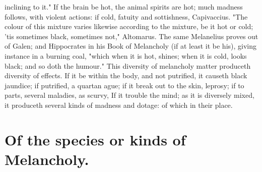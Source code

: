 inclining to it." If the brain be hot, the animal spirits are hot; much madness
follows, with violent actions: if cold, fatuity and sottishness,
Capivaccius. "The colour of this
mixture varies likewise according to the mixture, be it hot or cold; 'tis
sometimes black, sometimes not," Altomarus. The same
Melanelius proves out of Galen; and Hippocrates in his
Book of Melancholy (if at least it be his), giving instance in a burning coal,
"which when it is hot, shines; when it is cold, looks black; and so doth the
humour." This diversity of melancholy matter produceth diversity of effects. If
it be within the body, and not putrified, it causeth black
jaundice; if putrified, a quartan ague; if it break out to the skin, leprosy;
if to parts, several maladies, as scurvy, \etc{} If it trouble the mind; as it
is diversely mixed, it produceth several kinds of madness and dotage: of which
in their place.

\section{Of the species or kinds of Melancholy.}

